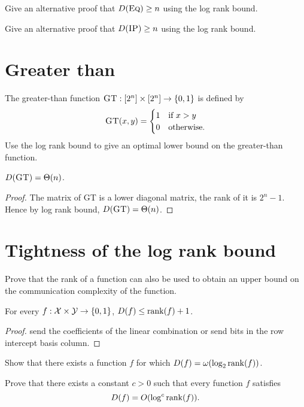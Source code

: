 \exercises

\begin{exercise} %
Give an alternative proof that $D(\textsc{Eq}) \ge n$ using the log rank bound.
\end{exercise}

\begin{exercise}
Give an alternative proof that $D(\textsc{IP}) \ge n$ using the log rank bound.\end{exercise}


\newpage \section{Greater than}

The greater-than function $\textsc{GT} : [2^n] \times [2^n] \to \{0,1\}$ is defined by
\[
\textsc{GT}(x,y) = \begin{cases}
1 & \mbox{if } x > y \\
0 & \mbox{otherwise.}
\end{cases}
\]
Use the log rank bound to give an optimal lower bound on the greater-than function.

\begin{theorem}
$D(\textsc{GT}) = \Theta(n)$.
\end{theorem}

\begin{proof}
The matrix of GT is a lower diagonal matrix, the rank of it is $2^n - 1$. Hence by log rank bound, $D(\textsc{GT}) = \Theta(n)$.
\end{proof}



\newpage \section{Tightness of the log rank bound}

Prove that the rank of a function can also be used to obtain an upper bound on the communication complexity of the function.

\begin{theorem}
For every $f : \mathcal{X} \times \mathcal{Y} \to \{0,1\}$, $D(f) \le \mathrm{rank}(f) + 1$.
\end{theorem}

\begin{proof}
send the coefficients of the linear combination or send bits in the row intercept basis column. 
\end{proof}

\exercises

\begin{exercise} %
Show that there exists a function $f$ for which $D(f) = \omega( \log_2 \mathrm{rank}(f) )$.
\end{exercise}

\begin{open}
Prove that there exists a constant $c > 0$ such that every function $f$ satisfies
\[
D(f) = O( \log^c \mathrm{rank}(f)).
\]
\end{open}


% 